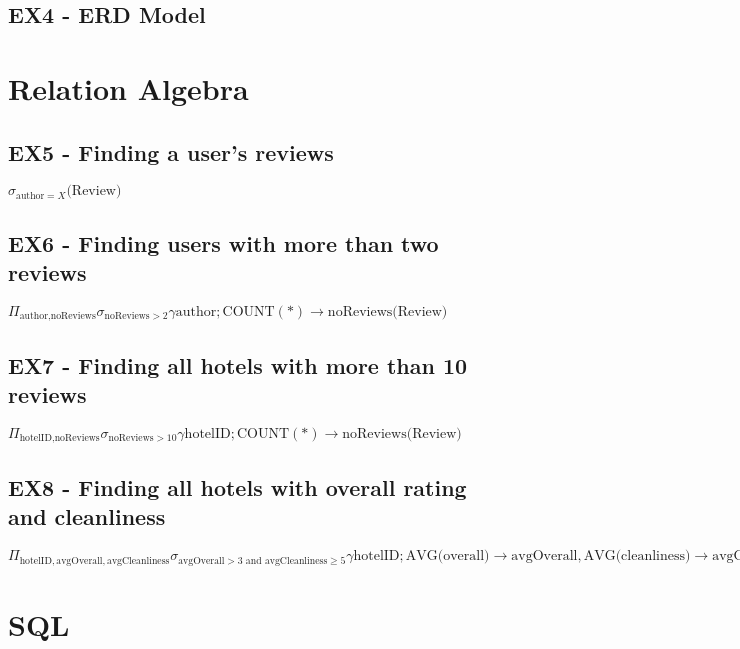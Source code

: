 \documentclass[a4paper]{article}
\begin{document}
%
%
\subsection{EX4 - ERD Model}
\begin{center}
\def\svgwidth{0.4 \columnwidth}

\end{center}

\section{Relation Algebra}

%
%
\subsection{EX5 - Finding a user's reviews}
$\sigma_{\textrm{author}=X} \textrm{(Review)}$

%
%
\subsection{EX6 - Finding users with more than two reviews}
$\Pi_{\textrm{author}, \textrm{noReviews}}\sigma_{\textrm{noReviews} > 2} \gamma \textrm{author}; \textrm{COUNT}(*) \to \textrm{noReviews} \textrm{(Review)}$

%
%
\subsection{EX7 - Finding all hotels with more than 10 reviews}
$\Pi_{\textrm{hotelID}, \textrm{noReviews}}\sigma_{\textrm{noReviews} > 10} \gamma \textrm{hotelID}; \textrm{COUNT}(*) \to \textrm{noReviews} \textrm{(Review)}$

%
%
\subsection{EX8 - Finding all hotels with overall rating and cleanliness}
$\Pi_{\textrm{hotelID}, \textrm{avgOverall}, \textrm{avgCleanliness}}\sigma_{\textrm{avgOverall} > 3 \textrm{ and } \textrm{avgCleanliness} \geq 5} \gamma \textrm{hotelID}; \textrm{AVG(overall)} \to \textrm{avgOverall},  \textrm{AVG(cleanliness)} \to \textrm{avgCleanliness} \textrm{(Review)}$

\section{SQL}

%
%
\end{document}
